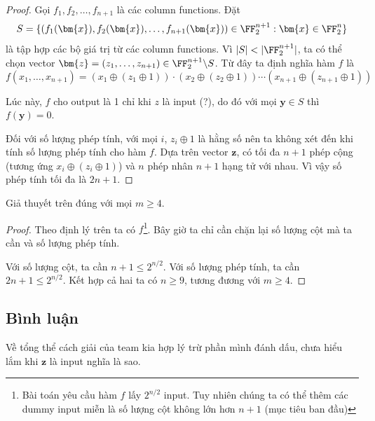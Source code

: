 \begin{proof}
    Gọi $f_1, f_2, \ldots, f_{n+1}$ là các column functions. Đặt
    \begin{equation*}
        S = \{ (f_1(\bm{x}), f_2(\bm{x}), \ldots, f_{n+1}(\bm{x})) \in \FF_2^{n+1} : \bm{x} \in \FF_2^n \}
    \end{equation*}
    là tập hợp các bộ giá trị từ các column functions. Vì $\lvert S \rvert < \lvert \FF_2^{n+1} \rvert$, ta có thể chọn vector $\bm{z} = (z_1, \ldots, z_{n+1}) \in \FF_2^{n+1} \backslash S$. Từ đây ta định nghĩa hàm $f$ là
    \begin{equation*}
        f(x_1, \ldots, x_{n+1}) = (x_1 \oplus (z_1 \oplus 1)) \cdot (x_2 \oplus (z_2 \oplus 1)) \cdots (x_{n+1} \oplus (z_{n+1} \oplus 1))
    \end{equation*}

    Lúc này, $f$ cho output là 1 chỉ khi $z$ là input (?), do đó với mọi $\bm{y} \in S$ thì $f(\bm{y}) = 0$.

    Đối với số lượng phép tính, với mọi $i$, $z_i \oplus 1$ là hằng số nên ta không xét đến khi tính số lượng phép tính cho hàm $f$. Dựa trên vector $\bm{z}$, có tối đa $n+1$ phép cộng (tương ứng $x_i \oplus (z_i \oplus 1)$) và $n$ phép nhân $n+1$ hạng tử với nhau. Vì vậy số phép tính tối đa là $2n+1$.
\end{proof}

\begin{corollary}
    Giả thuyết trên đúng với mọi $m \geqslant 4$.
\end{corollary}

\begin{proof}
    Theo định lý trên ta có $f$\footnote{Bài toán yêu cầu hàm $f$ lấy $2^{n/2}$ input. Tuy nhiên chúng ta có thể thêm các dummy input miễn là số lượng cột không lớn hơn $n+1$ (mục tiêu ban đầu)}. Bây giờ ta chỉ cần chặn lại số lượng cột mà ta cần và số lượng phép tính.

    Với số lượng cột, ta cần $n + 1 \leqslant 2^{n/2}$. Với số lượng phép tính, ta cần $2n + 1 \leqslant 2^{n/2}$. Kết hợp cả hai ta có $n \geqslant 9$, tương đương với $m \geqslant 4$.
\end{proof}

\subsection*{Bình luận}

Về tổng thể cách giải của team kia hợp lý trừ phần mình đánh dấu, chưa hiểu lắm khi $\bm{z}$ là input nghĩa là sao.

